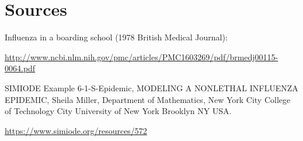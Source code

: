 \documentclass{ximera}
\begin{document}

\section*{Sources}
Influenza in a boarding school (1978 British Medical Journal): 

\href{http://www.ncbi.nlm.nih.gov/pmc/articles/PMC1603269/pdf/brmedj00115-0064.pdf}{http://www.ncbi.nlm.nih.gov/pmc/articles/PMC1603269/pdf/brmedj00115-0064.pdf}

SIMIODE Example 6-1-S-Epidemic, MODELING A NONLETHAL INFLUENZA EPIDEMIC, Sheila Miller, Department of Mathematics, New York City College of Technology City University of New York Brooklyn NY USA. 

\href{https://www.simiode.org/resources/572}{https://www.simiode.org/resources/572}
\end{document}
